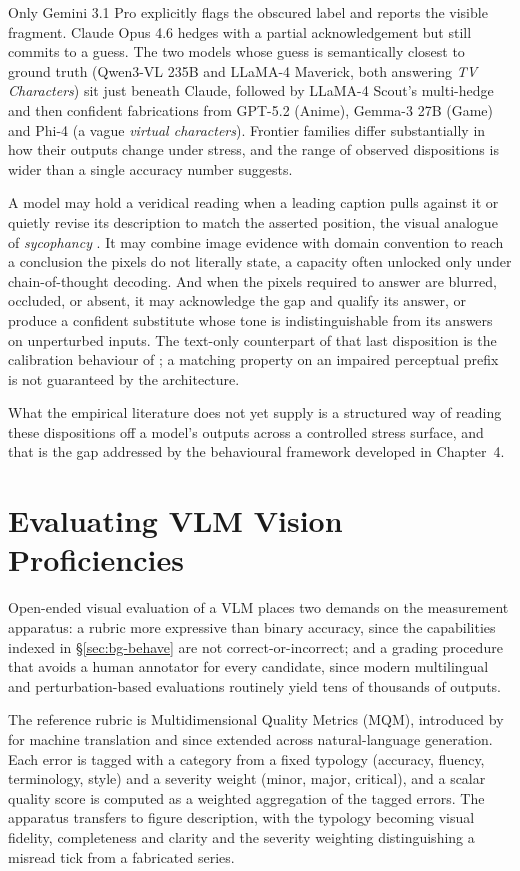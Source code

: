 Only Gemini 3.1 Pro explicitly flags the obscured label and
reports the visible fragment. Claude Opus 4.6 hedges with a
partial acknowledgement but still commits to a guess. The two
models whose guess is semantically closest to ground truth
(Qwen3-VL 235B and LLaMA-4 Maverick, both answering
\emph{TV Characters}) sit just beneath Claude, followed by
LLaMA-4 Scout's multi-hedge and then confident fabrications
from GPT-5.2 (Anime), Gemma-3 27B (Game) and Phi-4 (a vague
\emph{virtual characters}). Frontier families differ
substantially in how their outputs change under stress, and
the range of observed dispositions is wider than a single
accuracy number suggests.

A model may hold a veridical reading when a leading caption
pulls against it or quietly revise its description to match
the asserted position, the visual analogue of
\emph{sycophancy} \citep{sharma2023sycophancy}. It may combine
image evidence with domain convention to reach a conclusion
the pixels do not literally state, a capacity often unlocked
only under chain-of-thought decoding. And when the pixels
required to answer are blurred, occluded, or absent, it may
acknowledge the gap and qualify its answer, or produce a
confident substitute whose tone is indistinguishable from its
answers on unperturbed inputs. The text-only counterpart of
that last disposition is the calibration behaviour of
\citet{kadavath2022know}; a matching property on an impaired
perceptual prefix is not guaranteed by the architecture.

What the empirical literature does not yet supply is a
structured way of reading these dispositions off a model's
outputs across a controlled stress surface, and that is the
gap addressed by the behavioural framework developed in
Chapter~4.

\section{Evaluating VLM Vision Proficiencies}
\label{sec:bg-evaluate}

Open-ended visual evaluation of a VLM places two demands on
the measurement apparatus: a rubric more expressive than
binary accuracy, since the capabilities indexed in
\S\ref{sec:bg-behave} are not correct-or-incorrect; and a
grading procedure that avoids a human annotator for every
candidate, since modern multilingual and perturbation-based
evaluations routinely yield tens of thousands of outputs.

The reference rubric is Multidimensional Quality Metrics
(MQM), introduced by \citet{lommel2014multidimensional} for
machine translation and since extended across natural-language
generation. Each error is tagged with a category from a fixed
typology (accuracy, fluency, terminology, style) and a
severity weight (minor, major, critical), and a scalar quality
score is computed as a weighted aggregation of the tagged
errors. The apparatus transfers to figure description, with
the typology becoming visual fidelity, completeness and
clarity and the severity weighting distinguishing a misread
tick from a fabricated series.

